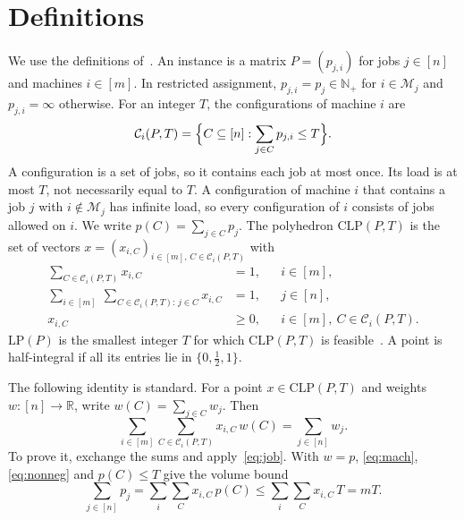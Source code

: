 \documentclass[11pt]{article}
\theoremstyle{remark}
\newcommand{\cC}{\mathcal{C}}
\newcommand{\cM}{\mathcal{M}}
\newcommand{\CLP}{\mathrm{CLP}}
\newcommand{\LP}{\mathrm{LP}}
\begin{document}
\section{Definitions}\label{sec:defs}
We use the definitions of~\cite[Section~6]{EMV}. An instance is a matrix
$P=(p_{j,i})$ for jobs $j\in[n]$ and machines $i\in[m]$. In restricted
assignment, $p_{j,i}=p_j\in\mathbb{N}_+$ for $i\in\cM_j$ and
$p_{j,i}=\infty$ otherwise. For an integer $T$, the configurations of
machine $i$ are
\begin{equation}\label{eq:conf}
\cC_i(P,T)=\Bigl\{C\subseteq[n] : \sum_{j\in C}p_{j,i}\le T\Bigr\}.
\end{equation}
A configuration is a set of jobs, so it contains each job at most once.
Its load is at most $T$, not necessarily equal to $T$. A configuration
of machine $i$ that contains a job $j$ with $i\notin\cM_j$ has infinite
load, so every configuration of $i$ consists of jobs allowed on $i$.
We write $p(C)=\sum_{j\in C}p_j$. The polyhedron $\CLP(P,T)$ is the set of
vectors $x=(x_{i,C})_{i\in[m],\,C\in\cC_i(P,T)}$ with
\begin{align}
\sum_{C\in\cC_i(P,T)}x_{i,C}&=1, && i\in[m],\label{eq:mach}\\
\sum_{i\in[m]}\ \sum_{C\in\cC_i(P,T):\,j\in C}x_{i,C}&=1, && j\in[n],\label{eq:job}\\
x_{i,C}&\ge 0, && i\in[m],\ C\in\cC_i(P,T).\label{eq:nonneg}
\end{align}
$\LP(P)$ is the smallest integer $T$ for which $\CLP(P,T)$ is
feasible~\cite[p.~23:8]{EMV}. A point is half-integral if all its
entries lie in $\{0,\frac12,1\}$.

The following identity is standard. For a point $x\in\CLP(P,T)$ and
weights $w\colon[n]\to\mathbb{R}$, write $w(C)=\sum_{j\in C}w_j$. Then
\begin{equation}\label{eq:count}
\sum_{i\in[m]}\sum_{C\in\cC_i(P,T)}x_{i,C}\,w(C)=\sum_{j\in[n]}w_j .
\end{equation}
To prove it, exchange the sums and apply~\eqref{eq:job}. With $w=p$,
\eqref{eq:mach}, \eqref{eq:nonneg} and $p(C)\le T$ give the volume bound
\begin{equation}\label{eq:volume}
\sum_{j\in[n]}p_j=\sum_{i}\sum_{C}x_{i,C}\,p(C)\le\sum_i\sum_C x_{i,C}\,T=mT .
\end{equation}
\end{document}

